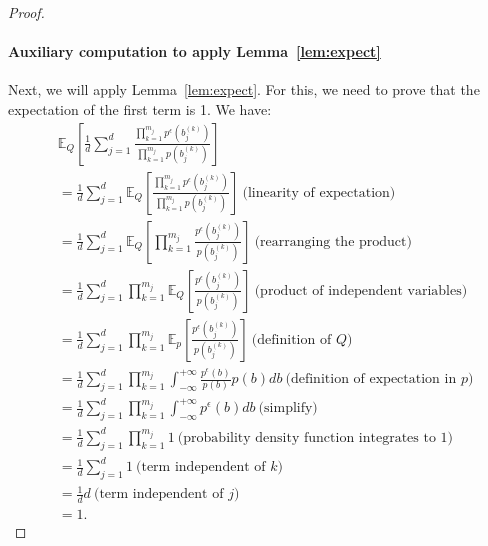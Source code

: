 \begin{proof}
\paragraph{Auxiliary computation to apply Lemma~\ref{lem:expect}} Next, we will apply Lemma~\ref{lem:expect}. For this, we need to prove that the expectation of the first term is 1. We have:
\begin{align*}
    &\mathbb{E}_Q\left[
        \frac{1}{d}
            \sum_{j=1}^d 
            \frac{\prod_{k=1}^{m_j} p^{\epsilon}(b_j^{(k)})}{\prod_{k=1}^{m_j} p(b_j^{(k)})}
            \right]\\
    &= \frac{1}{d}
          \sum_{j=1}^d 
            \mathbb{E}_Q\left[
            \frac{\prod_{k=1}^{m_j} p^{\epsilon}(b_j^{(k)})}{\prod_{k=1}^{m_j} p(b_j^{(k)})}
            \right]~\text{(linearity of expectation)}\\
    &= \frac{1}{d}
          \sum_{j=1}^d 
            \mathbb{E}_Q\left[
            \prod_{k=1}^{m_j} \frac{p^{\epsilon}(b_j^{(k)})}{p(b_j^{(k)})}
            \right]~\text{(rearranging the product)}\\
    &= \frac{1}{d}
          \sum_{j=1}^d 
            \prod_{k=1}^{m_j} 
            \mathbb{E}_Q\left[\frac{p^{\epsilon}(b_j^{(k)})}{p(b_j^{(k)})}
            \right]~\text{(product of independent variables)}\\
    &= \frac{1}{d}
          \sum_{j=1}^d 
            \prod_{k=1}^{m_j} 
            \mathbb{E}_p\left[\frac{p^{\epsilon}(b_j^{(k)})}{p(b_j^{(k)})}
            \right]~\text{(definition of $Q$)}\\ 
    &= \frac{1}{d}
          \sum_{j=1}^d 
            \prod_{k=1}^{m_j} 
            \int_{-\infty}^{+\infty}\frac{p^{\epsilon}(b)}{p(b)}
            p(b)db~\text{(definition of expectation in $p$)}\\ 
    &= \frac{1}{d}
          \sum_{j=1}^d 
            \prod_{k=1}^{m_j} 
            \int_{-\infty}^{+\infty}p^{\epsilon}(b)db~\text{(simplify)}\\
    &= \frac{1}{d}
          \sum_{j=1}^d 
            \prod_{k=1}^{m_j} 
            1~\text{(probability density function integrates to $1$)}\\
    &= \frac{1}{d}
          \sum_{j=1}^d 
            1~\text{(term independent of $k$)}\\
    &= \frac{1}{d}
          d~\text{(term independent of $j$)}\\
    &=1.
\end{align*}


\end{proof}
